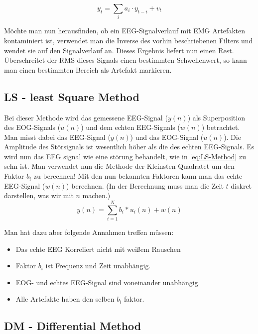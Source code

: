 \documentclass[preprint,12pt]{elsarticle}
\begin{document}
\begin{equation}
y_t = \sum_i a_i \cdot y_{t-i} + v_t
\end{equation}

Möchte man nun herausfinden, ob ein EEG-Signalverlauf mit EMG Artefakten kontaminiert ist, verwendet man die Inverse
des vorhin beschriebenen Filters und wendet sie auf den Signalverlauf an. Dieses Ergebnis liefert nun einen Rest.
Überschreitet der RMS dieses Signals einen bestimmten Schwellenwert, so kann man einen bestimmten Bereich als Artefakt markieren.
~\cite{Pfurtscheller2007}



\subsection{LS - least Square Method}

Bei dieser Methode wird das gemessene EEG-Signal ($y(n)$) als Superposition des EOG-Signals ($u(n)$) und dem echten EEG-Signals
 ($w(n)$) betrachtet. Man misst dabei das EEG-Signal ($y(n)$) und das EOG-Signal ($u(n)$). Die Amplitude des Störsignals ist wesentlich höher als die des
 echten EEG-Signals. Es wird nun das EEG signal wie eine störung behandelt, wie in \ref{eq:LS-Method} zu sehn ist. Man verwendet nun die Methode der Kleinsten
 Quadratet um den Faktor $b_i$ zu berechnen! Mit den nun bekannten Faktoren kann man das echte EEG-Signal ($w(n)$) berechnen.
(In der Berechnung muss man die Zeit $t$ diskret darstellen, was wir mit $n$  machen.)~\cite{Thulasidas2004}
\begin{equation} \label{eq:LS-Method}
 y(n) =  \sum_{i=1}^{N} b_i * u_i(n) + w(n)
\end{equation}

Man hat dazu aber folgende Annahmen treffen müssen:
\begin{itemize}
 \item Das echte EEG Korreliert nicht mit weißem Rauschen
 \item Faktor $b_i$ ist Frequenz und Zeit unabhängig.
 \item EOG- und echtes EEG-Signal sind voneinander unabhängig.
 \item Alle Artefakte haben den selben $b_i$ faktor.
\end{itemize}




\subsection{DM - Differential Method}
\end{document}
